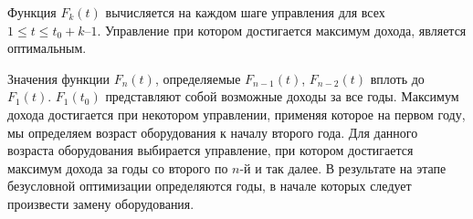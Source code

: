 Функция $F_k(t)$ вычисляется на каждом шаге управления для всех $1 \leq t \leq t_0 + k – 1$. Управление при котором достигается максимум дохода, является оптимальным.

Значения функции $F_n(t)$, определяемые $F_{n-1}(t)$, $F_{n-2}(t)$ вплоть до $F_1(t)$. $F_1(t_0)$ представляют собой возможные доходы за все годы. Максимум дохода достигается при некотором управлении, применяя которое на первом году, мы определяем возраст оборудования к началу второго года. Для данного возраста оборудования выбирается управление, при котором достигается максимум дохода за годы со второго по $n$-й и так далее. В результате на этапе безусловной оптимизации определяются годы, в начале которых следует произвести замену оборудования.